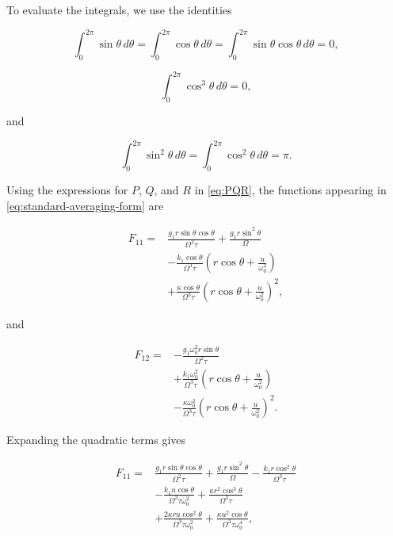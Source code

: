 \documentclass[11pt,reqno]{amsart}
\theoremstyle{plain}
\theoremstyle{definition}
\theoremstyle{remark}
\begin{document}
To evaluate the integrals, we use the identities

\[
\int_0^{2\pi}\sin\theta\,d\theta
=
\int_0^{2\pi}\cos\theta\,d\theta
=
\int_0^{2\pi}\sin\theta\cos\theta\,d\theta
=
0,
\]

\[
\int_0^{2\pi}\cos^3\theta\,d\theta
=
0,
\]

and

\[
\int_0^{2\pi}\sin^2\theta\,d\theta
=
\int_0^{2\pi}\cos^2\theta\,d\theta
=
\pi.
\]

Using the expressions for $P$, $Q$, and $R$ in
\eqref{eq:PQR}, the functions appearing in
\eqref{eq:standard-averaging-form} are

\begin{equation}
\label{eq:F11-unexpanded}
\boxed{
\begin{aligned}
F_{11}
={}&
\frac{g_1r\sin\theta\cos\theta}{\Omega^2\tau}
+\frac{g_1r\sin^2\theta}{\Omega}
\\
&
-\frac{k_1\cos\theta}{\Omega^3\tau}
\left(
r\cos\theta+\frac{u}{\omega_0^2}
\right)
\\
&
+\frac{\kappa\cos\theta}{\Omega^3\tau}
\left(
r\cos\theta+\frac{u}{\omega_0^2}
\right)^2,
\end{aligned}}
\end{equation}

and

\begin{equation}
\label{eq:F12-unexpanded}
\boxed{
\begin{aligned}
F_{12}
={}&
-\frac{g_1\omega_0^2r\sin\theta}
{\Omega^2\tau}
\\
&
+\frac{k_1\omega_0^2}
{\Omega^3\tau}
\left(
r\cos\theta+\frac{u}{\omega_0^2}
\right)
\\
&
-\frac{\kappa\omega_0^2}
{\Omega^3\tau}
\left(
r\cos\theta+\frac{u}{\omega_0^2}
\right)^2.
\end{aligned}}
\end{equation}

Expanding the quadratic terms gives

\begin{equation}
\label{eq:F11-expanded}
\boxed{
\begin{aligned}
F_{11}
={}&
\frac{g_1r\sin\theta\cos\theta}{\Omega^2\tau}
+\frac{g_1r\sin^2\theta}{\Omega}
-\frac{k_1r\cos^2\theta}{\Omega^3\tau}
\\
&
-\frac{k_1u\cos\theta}
{\Omega^3\tau\omega_0^2}
+\frac{\kappa r^2\cos^3\theta}
{\Omega^3\tau}
\\
&
+\frac{2\kappa ru\cos^2\theta}
{\Omega^3\tau\omega_0^2}
+\frac{\kappa u^2\cos\theta}
{\Omega^3\tau\omega_0^4},
\end{aligned}}
\end{equation}
\end{document}
